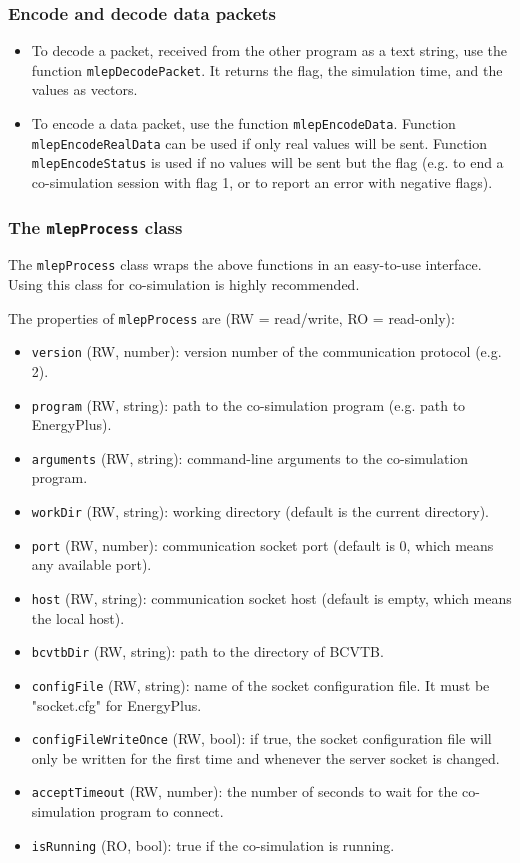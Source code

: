 \documentclass[11pt,letter]{article}
\begin{document}
\subsubsection{Encode and decode data packets}
\label{sec-4-5-3}

\begin{itemize}
\item To decode a packet, received from the other program as a text
string, use the function \verb+mlepDecodePacket+.  It
returns the flag, the simulation time, and the values as vectors.
\item To encode a data packet, use the function
\verb+mlepEncodeData+.  Function
\verb+mlepEncodeRealData+ can be used if only real values
will be sent.  Function \verb+mlepEncodeStatus+ is used if
no values will be sent but the flag (e.g. to end a
co-simulation session with flag 1, or to report an error with
negative flags).
\end{itemize}

\subsubsection{The \texttt{mlepProcess} class}
\label{sec-4-5-4}

The \verb+mlepProcess+ class wraps the above functions in an
easy-to-use interface.  Using this class for co-simulation is highly
recommended.

The properties of \verb+mlepProcess+ are (RW =
read/write, RO = read-only):
\begin{itemize}
\item \texttt{version} (RW, number): version number of the
communication protocol (e.g. 2).
\item \texttt{program} (RW, string): path to the co-simulation
program (e.g. path to EnergyPlus).
\item \texttt{arguments} (RW, string): command-line arguments to
the co-simulation program.
\item \texttt{workDir} (RW, string): working directory (default is
the current directory).
\item \texttt{port} (RW, number): communication socket port
(default is 0, which means any available port).
\item \texttt{host} (RW, string): communication socket host
(default is empty, which means the local host).
\item \texttt{bcvtbDir} (RW, string): path to the directory of
BCVTB.
\item \texttt{configFile} (RW, string): name of the socket
configuration file.  It must be "socket.cfg" for EnergyPlus.
\item \texttt{configFileWriteOnce} (RW, bool): if true, the socket
configuration file will only be written for the first time and
whenever the server socket is changed.
\item \texttt{acceptTimeout} (RW, number): the number of seconds to
wait for the co-simulation program to connect.
\item \texttt{isRunning} (RO, bool): true if the co-simulation is
running.
\end{itemize}
\end{document}
